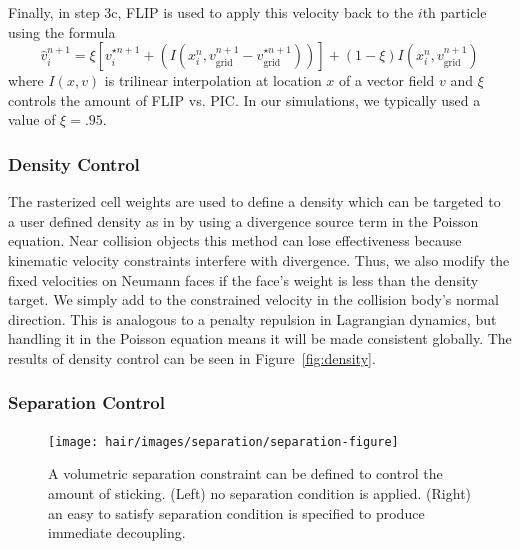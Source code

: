 Finally, in step 3c, FLIP is used to apply this velocity back to the $i$th
particle using the formula
$$\hat{v}_i^{n+1} =\xi \left[v_i^{\star n+1} +
(I(x_i^n,v_\textrm{grid}^{n+1}-v^{\star n+1}_\textrm{grid}))\right] +(1-
\xi)  I(x_i^n,v_\textrm{grid}^{n+1})$$ where $I(x,v)$ is trilinear
interpolation at location $x$ of a vector field $v$ and $\xi$
controls the amount of FLIP vs. PIC.  In our simulations, we typically
used a value of $\xi=.95$.

\subsubsection{Density Control}
\label{sec:density}

The rasterized cell weights are used to define a density which can be targeted
to a user defined density as in \cite{losasso:2007:sph} by using a divergence
source term in the Poisson equation. Near collision objects this method can lose
effectiveness because kinematic velocity constraints interfere with
divergence. Thus, we also modify the fixed velocities on Neumann faces if the
face's weight is less than the density target.  We simply add to the constrained
velocity in the collision body's normal direction. This is analogous to a
penalty repulsion in Lagrangian dynamics, but handling it in the Poisson
equation means it will be made consistent globally.  The results of density
control can be seen in Figure~\ref{fig:density}.

\subsubsection{Separation Control}

\begin{figure}[t]
  \centering
\texttt{[image: hair/images/separation/separation-figure]}
  \caption[A demonstration of separation control.]{\label{fig:separation} A volumetric separation 
constraint can be
    defined to control the amount of sticking. (Left) no separation condition is
  applied. (Right) an easy to satisfy separation condition is specified to
  produce immediate decoupling.}
\end{figure}


